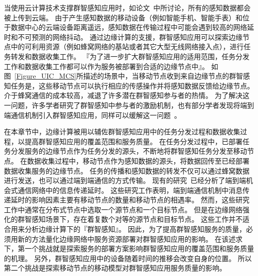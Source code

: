 当使用云计算技术支撑群智感知应用时，如论文~\cite{DBLP:journals/fgcs/AntonicMPZ16,DBLP:conf/ccnc/MessaoudRG16}中所讨论，所有的感知数据都会被上传到云端。
由于产生感知数据的移动设备（例如智能手机、智能手表）和位于数据中心的云端设备距离遥远，感知数据在传输过程中可能会遇到较高的网络延时和不可预测的网络抖动。
通过边缘计算的支援，群智感知应用可以探索边缘节点中的可利用资源（例如蜂窝网络的基站或者其它大型无线网络接入点），进行任务转发和数据收集工作。
『为了进一步扩大群智感知应用的适用范围，任务分发工作和数据收集工作都可以作为服务被部署到合适的边缘节点中』。
如图~\ref{Figure_UIC_MCS}所描述的场景中，当移动节点收到来自边缘节点的群智感知任务是，这些移动节点可以执行相应的传感操作并将感知数据反馈给边缘节点。
介于蜂窝通信的成本较高，减退了许多潜在群智感知参与者的热情。
为了解决这一问题，许多学者研究了群智感知中参与者的激励机制，也有部分学者发现将端到端通信机制引入群智感知应用，同样可以缓解这一问题~\cite{DBLP:journals/puc/WangLL17}。


在本章节中，边缘计算被用以辅佐群智感知应用中的任务分发过程和数据收集过程，以提高群智感知应用的覆盖范围和服务质量。
在任务分发过程中，已部署任务分发服务的边缘节点作为任务分发的源头，不断地将群智感知任务分发至移动节点。
在数据收集过程中，移动节点作为感知数据的源头，将数据回传至已经部署数据收集服务的边缘节点。
任务的传播和感知数据的转发不仅可以通过蜂窝数据进行发送，也可以通过端到端通信的方式传输。
现有的研究~\cite{DBLP:conf/wcnc/QinF13,DBLP:journals/twc/LiW14,DBLP:journals/winet/ZhaoMLT18}已经分析了端到端机会式通信网络中的信息传递延时。
这些研究工作表明，端到端通信机制中消息传递延时的影响因素主要有移动节点的数量和移动节点的相遇率。
然而，这些研究工作中通常在分布式节点中选取一个源节点和一个目标节点。
但是在边缘网络强化的群智感知场景下，存在着复数个对等的源节点和目标节点。
这些工作并不适合用来分析边缘计算下的『群智感知』。
因此，为了提高群智感知服务的质量，必须用新的方法量化边缘网络中服务资源部署对群智感知应用的影响。
在该述求下，第一个挑战就是探索服务的部署方案影响群智感知应用的覆盖范围和服务质量的机理。
另外，群智感知应用中的设备随着时间的推移会改变自身的位置。
所以第二个挑战是探索移动节点的移动模型对群智感知应用服务质量的影响。

